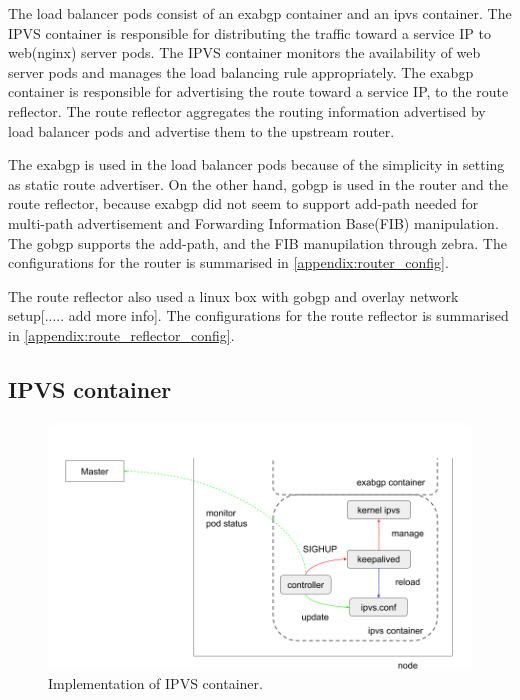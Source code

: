 The load balancer pods consist of an exabgp container and an ipvs container.
The IPVS container is responsible for distributing the traffic toward a service IP to web(nginx) server pods.
The IPVS container monitors the availability of web server pods and manages the load balancing rule appropriately.
The exabgp container is responsible for advertising the route toward a service IP, to the route reflector.
The route reflector aggregates the routing information advertised by load balancer pods and advertise them to the upstream router.

The exabgp is used in the load balancer pods because of the simplicity in setting as static route advertiser.
On the other hand, gobgp is used in the router and the route reflector, because exabgp did not seem to support add-path\cite{walton2016advertisement} needed for multi-path advertisement and Forwarding Information Base(FIB) manipulation\cite{exa-networks_2018}.
The gobgp supports the add-path, and the FIB manupilation through zebra\cite{osrg_gobgp_zebra}.
The configurations for the router is summarised in \ref{appendix:router_config}.

The route reflector also used a linux box with gobgp and overlay network setup[..... add more info].
The configurations for the route reflector is summarised in \ref{appendix:route_reflector_config}.

\subsection{IPVS container}

\begin{figure}
\includegraphics[width=\columnwidth]{Figs/ipvs-ingress-schem}
\caption{Implementation of IPVS container.}
\label{fig:ipvs-ingress-schem}
\end{figure}

